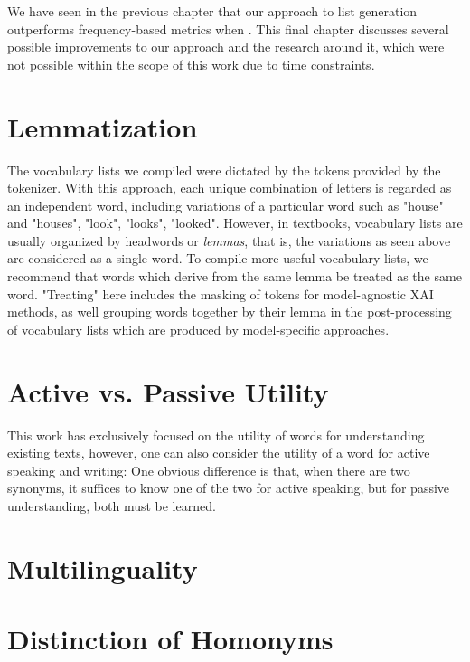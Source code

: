 %
We have seen in the previous chapter that our approach to list generation outperforms frequency-based metrics when .
This final chapter discusses several possible improvements to our approach and the research around it, which were not possible within the scope of this work due to time constraints.

\section{Lemmatization}
The vocabulary lists we compiled were dictated by the tokens provided by the tokenizer.
With this approach, each unique combination of letters is regarded as an independent word, including variations of a particular word such as "house" and "houses", "look", "looks", "looked".
However, in textbooks, vocabulary lists are usually organized by headwords or \textit{lemmas}, that is, the variations as seen above are considered as a single word.
To compile more useful vocabulary lists, we recommend that words which derive from the same lemma be treated as the same word.
"Treating" here includes the masking of tokens for model-agnostic XAI methods, as well grouping words together by their lemma in the post-processing of vocabulary lists which are produced by model-specific approaches.

\section{Active vs. Passive Utility}
This work has exclusively focused on the utility of words for understanding existing texts, however, one can also consider the utility of a word for active speaking and writing:
One obvious difference is that, when there are two synonyms, it suffices to know one of the two for active speaking, but for passive understanding, both must be learned.

\section{Multilinguality}

\section{Distinction of Homonyms}
